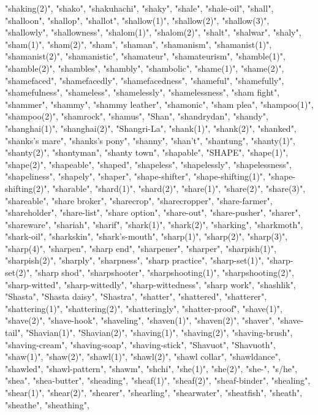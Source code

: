 "shaking(2)",
"shako",
"shakuhachi",
"shaky",
"shale",
"shale-oil",
"shall",
"shalloon",
"shallop",
"shallot",
"shallow(1)",
"shallow(2)",
"shallow(3)",
"shallowly",
"shallowness",
"shalom(1)",
"shalom(2)",
"shalt",
"shalwar",
"shaly",
"sham(1)",
"sham(2)",
"sham",
"shaman",
"shamanism",
"shamanist(1)",
"shamanist(2)",
"shamanistic",
"shamateur",
"shamateurism",
"shamble(1)",
"shamble(2)",
"shambles",
"shambly",
"shambolic",
"shame(1)",
"shame(2)",
"shamefaced",
"shamefacedly",
"shamefacedness",
"shameful",
"shamefully",
"shamefulness",
"shameless",
"shamelessly",
"shamelessness",
"sham fight",
"shammer",
"shammy",
"shammy leather",
"shamonic",
"sham plea",
"shampoo(1)",
"shampoo(2)",
"shamrock",
"shamus",
"Shan",
"shandrydan",
"shandy",
"shanghai(1)",
"shanghai(2)",
"Shangri-La",
"shank(1)",
"shank(2)",
"shanked",
"shanks's mare",
"shanks's pony",
"shanny",
"shan't",
"shantung",
"shanty(1)",
"shanty(2)",
"shantyman",
"shanty town",
"shapable",
"SHAPE",
"shape(1)",
"shape(2)",
"shapeable",
"shaped",
"shapeless",
"shapelessly",
"shapelessness",
"shapeliness",
"shapely",
"shaper",
"shape-shifter",
"shape-shifting(1)",
"shape-shifting(2)",
"sharable",
"shard(1)",
"shard(2)",
"share(1)",
"share(2)",
"share(3)",
"shareable",
"share broker",
"sharecrop",
"sharecropper",
"share-farmer",
"shareholder",
"share-list",
"share option",
"share-out",
"share-pusher",
"sharer",
"shareware",
"shariah",
"sharif",
"shark(1)",
"shark(2)",
"sharking",
"sharkmoth",
"shark-oil",
"sharkskin",
"shark's-mouth",
"sharp(1)",
"sharp(2)",
"sharp(3)",
"sharp(4)",
"sharpen",
"sharp end",
"sharpener",
"sharper",
"sharpish(1)",
"sharpish(2)",
"sharply",
"sharpness",
"sharp practice",
"sharp-set(1)",
"sharp-set(2)",
"sharp shod",
"sharpshooter",
"sharpshooting(1)",
"sharpshooting(2)",
"sharp-witted",
"sharp-wittedly",
"sharp-wittedness",
"sharp work",
"shashlik",
"Shasta",
"Shasta daisy",
"Shastra",
"shatter",
"shattered",
"shatterer",
"shattering(1)",
"shattering(2)",
"shatteringly",
"shatter-proof",
"shave(1)",
"shave(2)",
"shave-hook",
"shaveling",
"shaven(1)",
"shaven(2)",
"shaver",
"shave-tail",
"Shavian(1)",
"Shavian(2)",
"shaving(1)",
"shaving(2)",
"shaving-brush",
"shaving-cream",
"shaving-soap",
"shaving-stick",
"Shavuot",
"Shavuoth",
"shaw(1)",
"shaw(2)",
"shawl(1)",
"shawl(2)",
"shawl collar",
"shawldance",
"shawled",
"shawl-pattern",
"shawm",
"shchi",
"she(1)",
"she(2)",
"she-",
"s/he",
"shea",
"shea-butter",
"sheading",
"sheaf(1)",
"sheaf(2)",
"sheaf-binder",
"shealing",
"shear(1)",
"shear(2)",
"shearer",
"shearling",
"shearwater",
"sheatfish",
"sheath",
"sheathe",
"sheathing",
